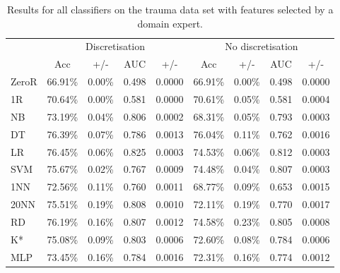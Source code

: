 \begin{table}[htbp]
\caption{Results for all classifiers on the trauma data set with features selected by a domain expert.}
\begin{tabular}{|l|cccc|cccc|}
\hline
 & \multicolumn{ 4}{c|}{Discretisation} & \multicolumn{ 4}{c|}{No discretisation} \\ 
  & Acc & +/- & AUC & +/- & Acc & +/- & AUC & +/- \\ \hline
  ZeroR & 66.91\% & 0.00\% & 0.498 & 0.0000 & 66.91\% & 0.00\% & 0.498 & 0.0000 \\ 
  1R & 70.64\% & 0.00\% & 0.581 & 0.0000 & 70.61\% & 0.05\% & 0.581 & 0.0004 \\ 
  NB & 73.19\% & 0.04\% & 0.806 & 0.0002 & 68.31\% & 0.05\% & 0.793 & 0.0003 \\ 
  DT & 76.39\% & 0.07\% & 0.786 & 0.0013 & 76.04\% & 0.11\% & 0.762 & 0.0016 \\ 
  LR & 76.45\% & 0.06\% & 0.825 & 0.0003 & 74.53\% & 0.06\% & 0.812 & 0.0003 \\ 
  SVM & 75.67\% & 0.02\% & 0.767 & 0.0009 & 74.48\% & 0.04\% & 0.807 & 0.0003 \\ 
  1NN & 72.56\% & 0.11\% & 0.760 & 0.0011 & 68.77\% & 0.09\% & 0.653 & 0.0015 \\ 
  20NN & 75.51\% & 0.19\% & 0.808 & 0.0010 & 72.11\% & 0.19\% & 0.770 & 0.0017 \\ 
  RD & 76.19\% & 0.16\% & 0.807 & 0.0012 & 74.58\% & 0.23\% & 0.805 & 0.0008 \\ 
  K* & 75.08\% & 0.09\% & 0.803 & 0.0006 & 72.60\% & 0.08\% & 0.784 & 0.0006 \\ 
  MLP & 73.45\% & 0.16\% & 0.784 & 0.0016 & 72.31\% & 0.16\% & 0.774 & 0.0012 \\ \hline
  \end{tabular}
\end{table}
